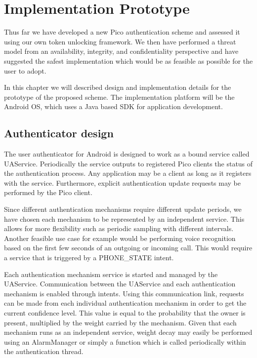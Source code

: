 
\chapter{Implementation Prototype} %

\label{Chapter4} %


Thus far we have developed a new Pico authentication scheme and assessed it using our own token unlocking framework. We then have performed a threat model from an availability, integrity, and confidentiality perspective and have suggested the safest implementation which would be as feasible as possible for the user to adopt.

In this chapter we will described design and implementation details for the prototype of the proposed scheme. The implementation platform will be the Android OS, which uses a Java based SDK for application development.

\section{Authenticator design}
The user authenticator for Android is designed to work as a bound service called UAService. Periodically the service outputs to registered Pico clients the status of the authentication process. Any application may be a client as long as it registers with the service. Furthermore, explicit authentication update requests may be performed by the Pico client.

Since different authentication mechanisms require different update periods, we have chosen each mechanism to be represented by an independent service. This allows for more flexibility such as periodic sampling with different intervals. Another feasible use case for example would be performing voice recognition based on the first few seconds of an outgoing or incoming call. This would require a service that is triggered by a PHONE\_STATE intent.

Each authentication mechanism service is started and managed by the UAService. Communication between the UAService and each authentication mechanism is enabled through intents. Using this communication link, requests can be made from each individual authentication mechanism in order to get the current confidence level. This value is equal to the probability that the owner is present, multiplied by the weight carried by the mechanism. Given that each mechanism runs as an independent service, weight decay may easily be performed using an AlarmManager or simply a function which is called periodically within the authentication thread.

